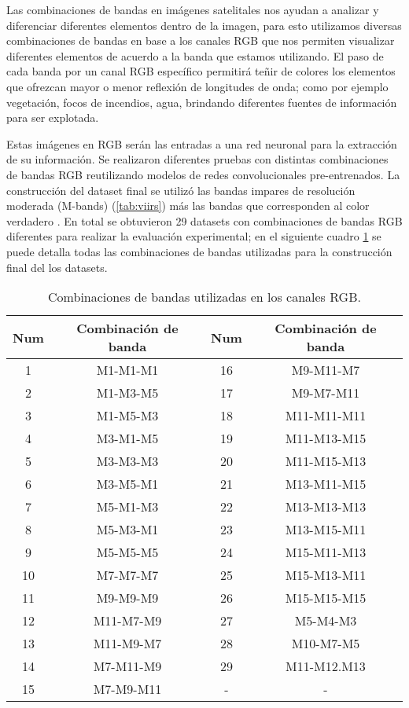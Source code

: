 Las combinaciones de bandas en imágenes satelitales nos ayudan a analizar y diferenciar diferentes elementos dentro de la imagen, para esto utilizamos diversas combinaciones de bandas en base a los canales RGB que nos permiten visualizar diferentes elementos de acuerdo a la banda que estamos utilizando. El paso de cada banda por un canal RGB específico permitirá teñir de colores los elementos que ofrezcan mayor o menor reflexión de longitudes de onda; como por ejemplo vegetación, focos de incendios, agua, brindando diferentes fuentes de información para ser explotada.

Estas imágenes en RGB serán las entradas a una red neuronal para la extracción de su información. Se realizaron diferentes pruebas con distintas combinaciones de bandas RGB reutilizando modelos de redes convolucionales pre-entrenados. La construcción del dataset final se utilizó las bandas impares de resolución moderada (M-bands) (\ref{tab:viirs})  más las bandas que corresponden al color verdadero . En total se obtuvieron 29 datasets con combinaciones de bandas RGB diferentes para realizar la evaluación experimental; en el siguiente cuadro  \ref{tab:combinacion_banda} se puede detalla todas las combinaciones de bandas utilizadas para la construcción final del los datasets.


\begin{table}[h] \begin{center}
\begin{tabular}{|c|c||c|c|}\hline 
\textbf{Num} & \textbf{Combinación de banda} & \textbf{Num} & \textbf{Combinación de banda} \\ \hline 
1  	& 	M1-M1-M1 			& 16  & 	M9-M11-M7  \\ \hline
2  	&   M1-M3-M5			& 17  & 	M9-M7-M11\\  \hline
3  	& 	M1-M5-M3			& 18  & 	M11-M11-M11\\ \hline
4  	&   M3-M1-M5 			& 19  & 	M11-M13-M15\\ \hline
5   & 	M3-M3-M3 			& 20  & 	M11-M15-M13\\ \hline
6   & 	M3-M5-M1 			& 21  & 	M13-M11-M15 \\ \hline
7   & 	M5-M1-M3 			& 22  & 	M13-M13-M13\\ \hline
8   & 	M5-M3-M1 			& 23  & 	M13-M15-M11\\ \hline
9   &   M5-M5-M5  			& 24  & 	M15-M11-M13\\ \hline
10  &	M7-M7-M7   			& 25  & 	M15-M13-M11\\ \hline
11  & 	M9-M9-M9   			& 26  & 	M15-M15-M15\\ \hline
12  & 	M11-M7-M9  			& 27  & 	M5-M4-M3\\ \hline
13  & 	M11-M9-M7  			& 28  & 	M10-M7-M5\\ \hline
14  &  	M7-M11-M9  			& 29  & 	M11-M12.M13\\ \hline
15  & 	M7-M9-M11  			& -& -\\ \hline      	
\end{tabular}
\end{center}\caption{Combinaciones de bandas utilizadas en los canales RGB. \label{tab:combinacion_banda}}
\end{table}

